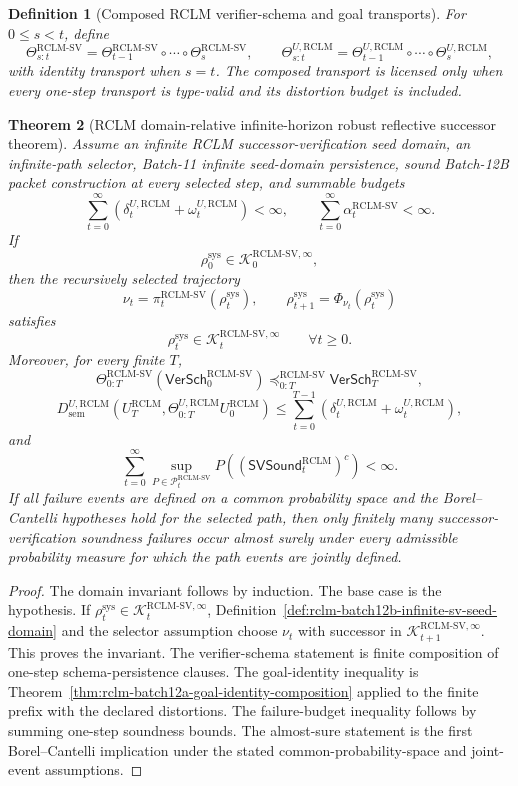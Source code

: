 \documentclass[11pt,a4paper]{article}
\newtheorem{theorem}{Theorem}[section]
\newtheorem{definition}[theorem]{Definition}
\newcommand{\Pcal}{\mathcal P}
\newcommand{\Kcal}{\mathcal K}
\newcommand{\RCLM}{\mathrm{RCLM}}
\newcommand{\sem}{\mathrm{sem}}
\newcommand{\sys}{\mathrm{sys}}
\begin{document}
\begin{definition}[Composed RCLM verifier-schema and goal transports]
\label{def:rclm-batch12b-composed-sv-goal-transports}
For \(0\le s<t\), define
\[
\Theta_{s:t}^{\RCLM\text{-}\mathrm{SV}}
=
\Theta_{t-1}^{\RCLM\text{-}\mathrm{SV}}\circ\cdots\circ\Theta_s^{\RCLM\text{-}\mathrm{SV}},
\qquad
\Theta_{s:t}^{U,\RCLM}
=
\Theta_{t-1}^{U,\RCLM}\circ\cdots\circ\Theta_s^{U,\RCLM},
\]
with identity transport when \(s=t\). The composed transport is licensed only when every one-step transport is type-valid and its distortion budget is included.
\end{definition}

\begin{theorem}[RCLM domain-relative infinite-horizon robust reflective successor theorem]
\label{thm:rclm-batch12b-domain-relative-infinite-rrst}
Assume an infinite RCLM successor-verification seed domain, an infinite-path selector, Batch-11 infinite seed-domain persistence, sound Batch-12B packet construction at every selected step, and summable budgets
\[
\sum_{t=0}^{\infty}(\delta_t^{U,\RCLM}+\omega_t^{U,\RCLM})<\infty,
\qquad
\sum_{t=0}^{\infty}\alpha_t^{\RCLM\text{-}\mathrm{SV}}<\infty.
\]
If
\[
\rho_0^{\sys}\in\Kcal_0^{\RCLM\text{-}\mathrm{SV},\infty},
\]
then the recursively selected trajectory
\[
\nu_t=\pi_t^{\RCLM\text{-}\mathrm{SV}}(\rho_t^{\sys}),
\qquad
\rho_{t+1}^{\sys}=\Phi_{\nu_t}(\rho_t^{\sys})
\]
satisfies
\[
\rho_t^{\sys}\in\Kcal_t^{\RCLM\text{-}\mathrm{SV},\infty}
\qquad\forall t\ge0.
\]
Moreover, for every finite \(T\),
\[
\Theta_{0:T}^{\RCLM\text{-}\mathrm{SV}}(\mathsf{VerSch}_0^{\RCLM\text{-}\mathrm{SV}})
\preceq_{0:T}^{\RCLM\text{-}\mathrm{SV}}
\mathsf{VerSch}_T^{\RCLM\text{-}\mathrm{SV}},
\]
\[
D_{\sem}^{U,\RCLM}(U_T^{\RCLM},\Theta_{0:T}^{U,\RCLM}U_0^{\RCLM})
\le
\sum_{t=0}^{T-1}(\delta_t^{U,\RCLM}+\omega_t^{U,\RCLM}),
\]
and
\[
\sum_{t=0}^{\infty}\sup_{P\in\Pcal_t^{\RCLM\text{-}\mathrm{SV}}}
P((\mathsf{SVSound}_t^{\RCLM})^c)<\infty.
\]
If all failure events are defined on a common probability space and the Borel--Cantelli hypotheses hold for the selected path, then only finitely many successor-verification soundness failures occur almost surely under every admissible probability measure for which the path events are jointly defined.
\end{theorem}

\begin{proof}
The domain invariant follows by induction. The base case is the hypothesis. If \(\rho_t^{\sys}\in\Kcal_t^{\RCLM\text{-}\mathrm{SV},\infty}\), Definition~\ref{def:rclm-batch12b-infinite-sv-seed-domain} and the selector assumption choose \(\nu_t\) with successor in \(\Kcal_{t+1}^{\RCLM\text{-}\mathrm{SV},\infty}\). This proves the invariant. The verifier-schema statement is finite composition of one-step schema-persistence clauses. The goal-identity inequality is Theorem~\ref{thm:rclm-batch12a-goal-identity-composition} applied to the finite prefix with the declared distortions. The failure-budget inequality follows by summing one-step soundness bounds. The almost-sure statement is the first Borel--Cantelli implication under the stated common-probability-space and joint-event assumptions.
\end{proof}
\end{document}
